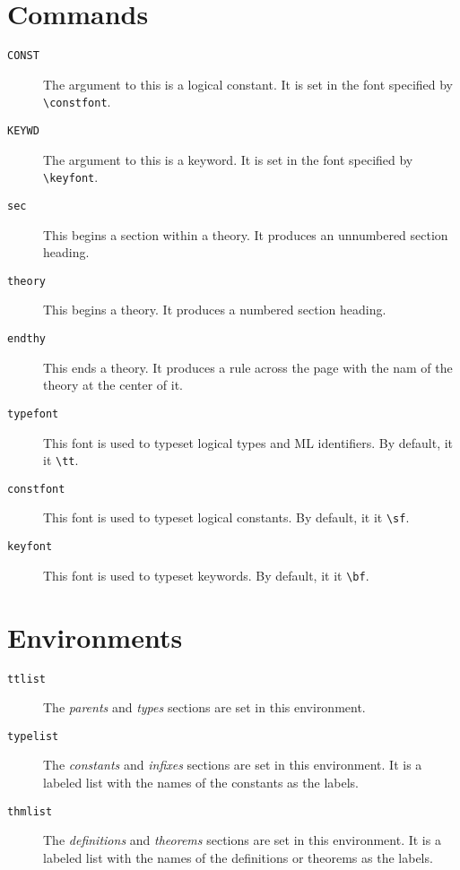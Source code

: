 \section*{Commands}
\begin{description}
\item[{\tt\BS CONST}]  The argument to this is a logical constant. It
	is set in the font specified by \verb|\constfont|.
\item[{\tt\BS KEYWD}]  The argument to this is a keyword. It
	is set in the font specified by \verb|\keyfont|.
\item[{\tt\BS sec}]  This begins a section within a theory. It produces
	an unnumbered section heading.
\item[{\tt\BS theory}]  This begins a theory. It produces a numbered
	section heading.
\item[{\tt\BS endthy}]  This ends a theory. It produces a rule across
	the page with the nam of the theory at the center of it.
\item[{\tt\BS typefont}]  This font is used to typeset logical
	types and ML identifiers. By default, it it \verb|\tt|.
\item[{\tt\BS constfont}]  This font is used to typeset logical
	constants. By default, it it \verb|\sf|.
\item[{\tt\BS keyfont}]  This font is used to typeset keywords.
	By default, it it \verb|\bf|.
\end{description}

\section*{Environments}

\begin{description}
\item[{\tt ttlist}] The {\it parents\/} and {\it types\/} sections are
	set in this environment.
\item[{\tt typelist}] The {\it constants\/} and {\it infixes\/}
	sections are set in this environment. It is a labeled list with the
	names of the constants as the labels.
\item[{\tt thmlist}] The {\it definitions\/} and {\it theorems\/}
	sections are set in this environment. It is a labeled list
	with the names of the definitions or theorems as the labels.
\end{description}